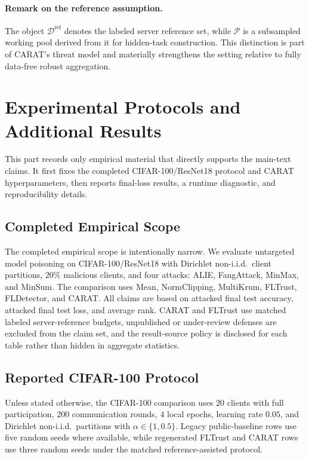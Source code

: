 \documentclass{article}
\begin{document}
\paragraph{Remark on the reference assumption.}
The object $\mathcal{D}^{\mathrm{ref}}$ denotes the labeled server reference set, while $\mathcal{P}$ is a subsampled working pool derived from it for hidden-task construction. This distinction is part of CARAT's threat model and materially strengthens the setting relative to fully data-free robust aggregation.

\section{Experimental Protocols and Additional Results}
\label{sec:appendix-experiments}

This part records only empirical material that directly supports the main-text claims. It first fixes the completed CIFAR-100/ResNet18 protocol and CARAT hyperparameters, then reports final-loss results, a runtime diagnostic, and reproducibility details.

\subsection{Completed Empirical Scope}

The completed empirical scope is intentionally narrow. We evaluate untargeted model poisoning on CIFAR-100/ResNet18 with Dirichlet non-i.i.d.\ client partitions, $20\%$ malicious clients, and four attacks: ALIE, FangAttack, MinMax, and MinSum. The comparison uses Mean, NormClipping, MultiKrum, FLTrust, FLDetector, and CARAT. All claims are based on attacked final test accuracy, attacked final test loss, and average rank. CARAT and FLTrust use matched labeled server-reference budgets, unpublished or under-review defenses are excluded from the claim set, and the result-source policy is disclosed for each table rather than hidden in aggregate statistics.

\subsection{Reported CIFAR-100 Protocol}

Unless stated otherwise, the CIFAR-100 comparison uses $20$ clients with full participation, $200$ communication rounds, $4$ local epochs, learning rate $0.05$, and Dirichlet non-i.i.d.\ partitions with $\alpha \in \{1,0.5\}$. Legacy public-baseline rows use five random seeds where available, while regenerated FLTrust and CARAT rows use three random seeds under the matched reference-assisted protocol.
\end{document}
